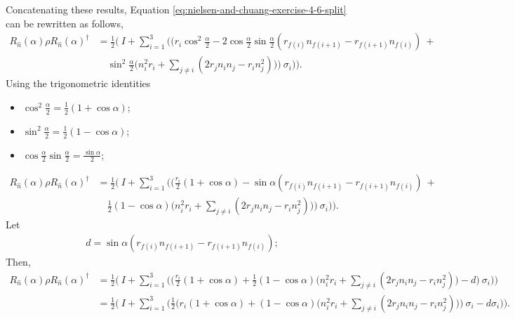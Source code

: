 Concatenating these results,
Equation \ref{eq:nielsen-and-chuang-exercise-4-6-split} can be rewritten as follows,
\begin{align}
    R_{\hat n}(\alpha) \rho R_{\hat n}(\alpha)^\dagger &= \frac{1}{2} \Bigg(
        \ I + \sum_{i = 1}^3 \bigg( \Big( r_i \cos^2\frac{\alpha}{2}
        - 2 \cos \frac{\alpha}{2} \sin \frac{\alpha}{2}
        (r_{f(i)}n_{f(i + 1)} - r_{f(i+1)}n_{f(i)})\ +
        \nonumber \\
        &\quad  \sin^2\frac{\alpha}{2} \big(
            n_i^2r_i + \sum_{j \neq i} (2 r_j n_i n_j - r_i n_j^2)
        \big)
    \Big)\ \sigma_i \bigg) \Bigg) .
\end{align}
Using the trigonometric identities
\begin{itemize}
    \item $\cos^2 \frac{\alpha}{2} = \frac{1}{2} (1 + \cos\alpha)$;
    \item $\sin^2 \frac{\alpha}{2} = \frac{1}{2} (1 - \cos\alpha)$;
    \item $\cos\frac{\alpha}{2} \sin\frac{\alpha}{2} = \frac{\sin\alpha}{2}$;
\end{itemize}
\begin{align}
    R_{\hat n}(\alpha) \rho R_{\hat n}(\alpha)^\dagger &= \frac{1}{2} \Bigg(
        \ I + \sum_{i = 1}^3 \bigg( \Big( \frac{r_i}{2} (1 + \cos\alpha)
        - \sin\alpha (r_{f(i)}n_{f(i + 1)} - r_{f(i+1)}n_{f(i)})\ +
        \nonumber \\
        &\quad \frac{1}{2} (1 - \cos\alpha) \big(
            n_i^2r_i + \sum_{j \neq i} (2 r_j n_i n_j - r_i n_j^2)
        \big)
    \Big)\ \sigma_i \bigg) \Bigg) .
\end{align}
Let
\begin{align}
    d = \sin\alpha (r_{f(i)}n_{f(i + 1)} - r_{f(i+1)}n_{f(i)});
\end{align}
Then,
\begin{align}
    R_{\hat n}(\alpha) \rho R_{\hat n}(\alpha)^\dagger &= \frac{1}{2} \Bigg(
        \ I + \sum_{i = 1}^3 \bigg( \Big( \frac{r_i}{2} (1 + \cos\alpha) +
        \frac{1}{2} (1 - \cos\alpha) \big(
            n_i^2r_i + \sum_{j \neq i} (2 r_j n_i n_j - r_i n_j^2)
        \big) - d
    \Big)\ \sigma_i \bigg) \Bigg) \\
    &= \frac{1}{2} \Bigg(
        \ I + \sum_{i = 1}^3 \bigg( \frac{1}{2} \Big( r_i (1 + \cos\alpha) +
        (1 - \cos\alpha) \big(
            n_i^2r_i + \sum_{j \neq i} (2 r_j n_i n_j - r_i n_j^2)
        \big)
    \Big)\ \sigma_i -d \sigma_i \bigg) \Bigg) .
\end{align}
